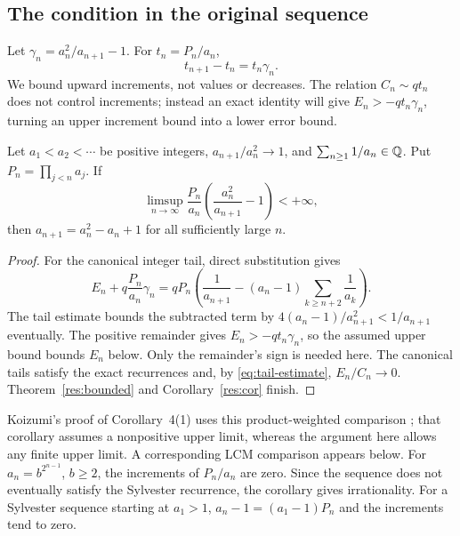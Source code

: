 \documentclass[11pt]{article}
\begin{document}
\subsection{The condition in the original sequence}\label{sec:product-bound}
Let $\gamma_n=a_n^2/a_{n+1}-1$. For $t_n=P_n/a_n$,
\[
 t_{n+1}-t_n=t_n\gamma_n.
\]
We bound upward increments, not values or decreases. The relation
$C_n\sim qt_n$ does not control increments; instead an exact identity
will give $E_n>-qt_n\gamma_n$, turning an upper increment bound into
a lower error bound.

\begin{corollary}\label{res:originalbounded}
Let $a_1<a_2<\cdots$ be positive integers, $a_{n+1}/a_n^2\to1$, and
$\sum_{n\ge1}1/a_n\in\mathbb{Q}$.  Put $P_n=\prod_{j<n}a_j$.  If
\[
 \limsup_{n\to\infty}\frac{P_n}{a_n}
 \left(\frac{a_n^2}{a_{n+1}}-1\right)<+\infty,
\]
then $a_{n+1}=a_n^2-a_n+1$ for all sufficiently large $n$.
\end{corollary}
\begin{proof}
For the canonical integer tail, direct substitution gives
\begin{equation}\label{eq:canonical-dictionary}
 E_n+q\frac{P_n}{a_n}\gamma_n
 =qP_n\left(\frac1{a_{n+1}}
 -(a_n-1)\sum_{k\ge n+2}\frac1{a_k}\right).
\end{equation}
The tail estimate bounds the subtracted term by
$4(a_n-1)/a_{n+1}^2<1/a_{n+1}$ eventually. The positive remainder gives
$E_n>-qt_n\gamma_n$, so the assumed upper bound bounds $E_n$ below.
Only the remainder's sign is needed here. The canonical tails satisfy
the exact recurrences and, by \eqref{eq:tail-estimate}, $E_n/C_n\to0$.
Theorem~\ref{res:bounded} and Corollary~\ref{res:cor} finish.
\end{proof}

Koizumi's proof of Corollary~4(1) uses this product-weighted comparison
\cite[(11)--(12), p.~15]{koizumi2025}; that corollary assumes a
nonpositive upper limit, whereas the argument here allows any finite
upper limit. A corresponding LCM comparison appears below.
For $a_n=b^{2^{n-1}}$, $b\ge2$, the increments of $P_n/a_n$ are zero.
Since the sequence does not eventually satisfy the Sylvester recurrence,
the corollary gives irrationality.
For a Sylvester sequence starting at $a_1>1$,
$a_n-1=(a_1-1)P_n$ and the increments tend to zero.
\end{document}
